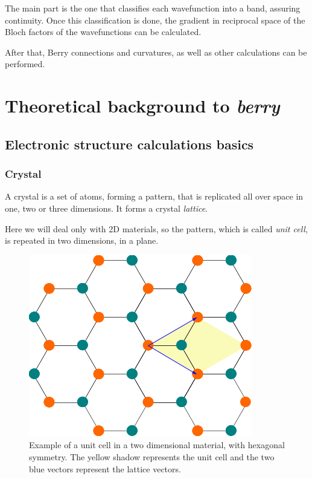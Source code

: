 \documentclass[a4paper,12pt]{report}
\begin{document}
The main part is the one that classifies each wavefunction into a band, assuring continuity.
Once this classification is done, the gradient in reciprocal space of the Bloch factors
of the wavefunctions can be calculated.

After that, Berry connections and curvatures, as well as other calculations can be performed.


\chapter{Theoretical background to \emph{berry}}

\section{Electronic structure calculations basics}

\subsection*{Crystal}
A crystal is a set of atoms, forming a pattern, that is replicated all over space in one, two or three dimensions.
It forms a crystal \emph{lattice}.

Here we will deal only with 2D materials, so the pattern, which is called \emph{unit cell},
is repeated in two dimensions, in a plane.

\begin{figure}
 \centering
 \includegraphics[scale=0.5,keepaspectratio=true]{figures/unitcell_honeycomb.png}
 \caption{Example of a unit cell in a two dimensional material, with hexagonal symmetry.
 The yellow shadow represents the unit cell and the two blue vectors represent the lattice vectors.}
 \label{fig:unitcell}
\end{figure}
\end{document}
